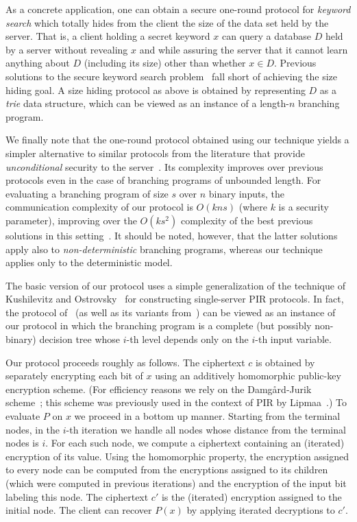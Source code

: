 \documentclass[11pt]{article}
\newcommand{\superparagraph}[1]{\medskip\noindent {\bf #1}}
\begin{document}
As a concrete application, one can obtain a secure one-round
protocol for {\em keyword search} which totally hides from the
client the size of the data set held by the server. That is, a
client holding a secret keyword $x$ can query a database $D$ held by
a server without revealing $x$ and while assuring the server that it
cannot learn anything about $D$ (including its size) other than
whether $x\in D$. Previous solutions to the secure keyword search
problem~\cite{CGN,FIPR05,OS} fall short of achieving the size hiding
goal. A size hiding protocol as above is obtained by representing
$D$ as a {\em trie} data structure, which can be viewed as an
instance of a length-$n$ branching program.

We finally note that the one-round protocol obtained using our
technique yields a simpler alternative to similar protocols from the
literature that provide {\em unconditional} security to the
server~\cite{syy99,beaver00,ik00,Rap,Kol}. Its complexity improves over
previous protocols even in the case of branching programs of
unbounded length. For evaluating a branching program of size $s$
over $n$ binary inputs, the communication complexity of our protocol
is $O(kns)$ (where $k$ is a security parameter), improving over the
$O(ks^2)$ complexity of the best previous solutions in this
setting~\cite{ik00}. It should be noted, however, that the latter
solutions apply also to {\em non-deterministic} branching programs,
whereas our technique applies only to the deterministic model.

\superparagraph{Techniques.} The basic version of our protocol uses
a simple generalization of the technique of Kushilevitz and
Ostrovsky~\cite{KO97} for constructing single-server PIR protocols.
In fact, the protocol of~\cite{KO97} (as well as its variants
from~\cite{Ste98,L04}) can be viewed as an instance of our protocol
in which the branching program is a complete (but possibly
non-binary) decision tree whose $i$-th level depends only on the
$i$-th input variable.

Our protocol proceeds roughly as follows. The ciphertext $c$ is
obtained by separately encrypting each bit of $x$ using an additively homomorphic public-key encryption scheme. (For efficiency reasons we
rely on the Damg{\aa}rd-Jurik scheme~\cite{DJ01}; this scheme was
previously used in the context of PIR by Lipmaa~\cite{L04}.) To
evaluate $P$ on $x$ we proceed in a bottom up manner. Starting from
the terminal nodes, in the $i$-th iteration we handle all nodes
whose distance from the terminal nodes is $i$. For each such node,
we compute a ciphertext containing an (iterated) encryption of its
value. Using the homomorphic property, the encryption assigned to
every node can be computed from the encryptions assigned to its
children (which were computed in previous iterations) and the
encryption of the input bit labeling this node.  The ciphertext $c'$
is the (iterated) encryption assigned to the initial node. The
client can recover $P(x)$ by applying iterated decryptions to $c'$.
\end{document}
